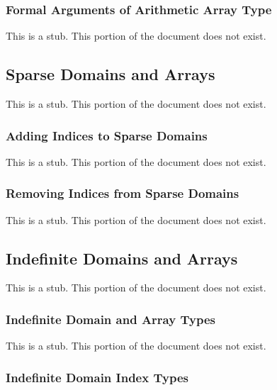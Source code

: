 \subsubsection{Formal Arguments of Arithmetic Array Type}
\label{Formal_Arguments_of_Arithmetic_Array_Type}

This is a stub.  This portion of the document does not exist.

\subsection{Sparse Domains and Arrays}
\label{Sparse_Domains_and_Arrays}

This is a stub.  This portion of the document does not exist.

\subsubsection{Adding Indices to Sparse Domains}
\label{Adding_Indices_to_Sparse_Domains}

This is a stub.  This portion of the document does not exist.

\subsubsection{Removing Indices from Sparse Domains}
\label{Removing_Indices_from_Sparse_Domains}

This is a stub.  This portion of the document does not exist.

\subsection{Indefinite Domains and Arrays}
\label{Indefinite_Domains_and_Arrays}

This is a stub.  This portion of the document does not exist.

\subsubsection{Indefinite Domain and Array Types}
\label{Indefinite_Domain_and_Array_Types}

This is a stub.  This portion of the document does not exist.

\subsubsection{Indefinite Domain Index Types}
\label{Indefinite_Domain_Index_Types}

